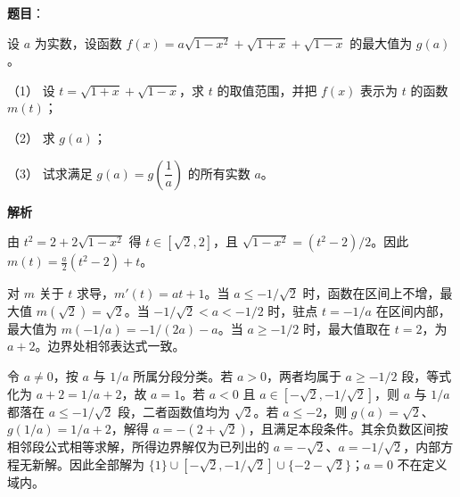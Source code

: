 \begin{answer}

\textbf{题目}：

设 $a$ 为实数，设函数 $f(x)=a\sqrt{1-x^2}+\sqrt{1+x}+\sqrt{1-x}$ 的最大值为 $g(a)$。

（1） 设 $t=\sqrt{1+x}+\sqrt{1-x}$，求 $t$ 的取值范围，并把 $f(x)$ 表示为 $t$ 的函数 $m(t)$；

（2） 求 $g(a)$；

（3） 试求满足 $g(a)=g\left(\dfrac1a\right)$ 的所有实数 $a$。

\textbf{解析}


由 $t^2=2+2\sqrt{1-x^2}$ 得 $t\in[\sqrt2,2]$，且 $\sqrt{1-x^2}=(t^2-2)/2$。因此 $m(t)=\frac a2(t^2-2)+t$。


对 $m$ 关于 $t$ 求导，$m'(t)=at+1$。当 $a\le-1/\sqrt2$ 时，函数在区间上不增，最大值 $m(\sqrt2)=\sqrt2$。当 $-1/\sqrt2<a<-1/2$ 时，驻点 $t=-1/a$ 在区间内部，最大值为 $m(-1/a)=-1/(2a)-a$。当 $a\ge-1/2$ 时，最大值取在 $t=2$，为 $a+2$。边界处相邻表达式一致。


令 $a\ne0$，按 $a$ 与 $1/a$ 所属分段分类。若 $a>0$，两者均属于 $a\ge-1/2$ 段，等式化为 $a+2=1/a+2$，故 $a=1$。若 $a<0$ 且 $a\in[-\sqrt2,-1/\sqrt2]$，则 $a$ 与 $1/a$ 都落在 $a\le-1/\sqrt2$ 段，二者函数值均为 $\sqrt2$。若 $a\le-2$，则 $g(a)=\sqrt2$、$g(1/a)=1/a+2$，解得 $a=-(2+\sqrt2)$，且满足本段条件。其余负数区间按相邻段公式相等求解，所得边界解仅为已列出的 $a=-\sqrt2$、$a=-1/\sqrt2$，内部方程无新解。因此全部解为 $\{1\}\cup[-\sqrt2,-1/\sqrt2]\cup\{-2-\sqrt2\}$；$a=0$ 不在定义域内。




\end{answer}
